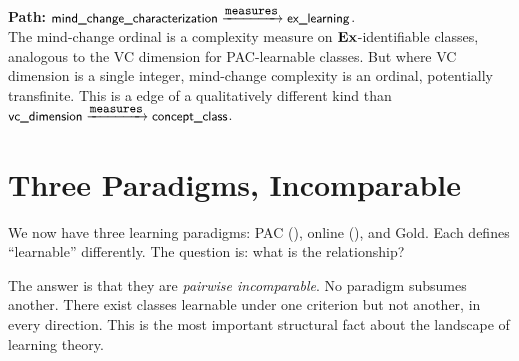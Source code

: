 \begin{traversal}
\textbf{Path:} $\textsf{\small mind\_change\_characterization} \xrightarrow{\texttt{\small measures}} \textsf{\small ex\_learning}$.\\[3pt]
The mind-change ordinal is a complexity measure on $\mathbf{Ex}$-identifiable classes, analogous to the VC dimension for PAC-learnable classes. But where VC dimension is a single integer, mind-change complexity is an ordinal, potentially transfinite. This is a  edge of a qualitatively different kind than $\textsf{\small vc\_dimension} \xrightarrow{\texttt{\small measures}} \textsf{\small concept\_class}$.
\end{traversal}


\section{Three Paradigms, Incomparable}
\label{sec:three-paradigm}

We now have three learning paradigms: PAC (), online (), and Gold. Each defines ``learnable'' differently. The question is: what is the relationship?

The answer is that they are \emph{pairwise incomparable}. No paradigm subsumes another. There exist classes learnable under one criterion but not another, in every direction. This is the most important structural fact about the landscape of learning theory.

